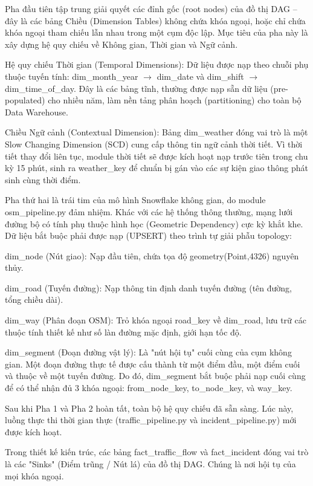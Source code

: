 Pha đầu tiên tập trung giải quyết các đỉnh gốc (root nodes) của đồ thị DAG – đây là các bảng Chiều (Dimension Tables) không chứa khóa ngoại, hoặc chỉ chứa khóa ngoại tham chiếu lẫn nhau trong một cụm độc lập. Mục tiêu của pha này là xây dựng hệ quy chiếu về Không gian, Thời gian và Ngữ cảnh.


Hệ quy chiếu Thời gian (Temporal Dimensions): Dữ liệu được nạp theo chuỗi phụ thuộc tuyến tính: dim\_month\_year $\rightarrow$  dim\_date và dim\_shift $\rightarrow$ dim\_time\_of\_day. Đây là các bảng tĩnh, thường được nạp sẵn dữ liệu (pre-populated) cho nhiều năm, làm nền tảng phân hoạch (partitioning) cho toàn bộ Data Warehouse.

Chiều Ngữ cảnh (Contextual Dimension): Bảng dim\_weather đóng vai trò là một Slow Changing Dimension (SCD) cung cấp thông tin ngữ cảnh thời tiết. Vì thời tiết thay đổi liên tục, module thời tiết sẽ được kích hoạt nạp trước tiên trong chu kỳ 15 phút, sinh ra weather\_key để chuẩn bị gán vào các sự kiện giao thông phát sinh cùng thời điểm.


Pha thứ hai là trái tim của mô hình Snowflake không gian, do module osm\_pipeline.py đảm nhiệm. Khác với các hệ thống thông thường, mạng lưới đường bộ có tính phụ thuộc hình học (Geometric Dependency) cực kỳ khắt khe. Dữ liệu bắt buộc phải được nạp (UPSERT) theo trình tự giải phẫu topology:


dim\_node (Nút giao): Nạp đầu tiên, chứa tọa độ geometry(Point,4326) nguyên thủy.


dim\_road (Tuyến đường): Nạp thông tin định danh tuyến đường (tên đường, tổng chiều dài).


dim\_way (Phân đoạn OSM): Trỏ khóa ngoại road\_key về dim\_road, lưu trữ các thuộc tính thiết kế như số làn đường mặc định, giới hạn tốc độ.


dim\_segment (Đoạn đường vật lý): Là "nút hội tụ" cuối cùng của cụm không gian. Một đoạn đường thực tế được cấu thành từ một điểm đầu, một điểm cuối và thuộc về một tuyến đường. Do đó, dim\_segment bắt buộc phải nạp cuối cùng để có thể nhận đủ 3 khóa ngoại: from\_node\_key, to\_node\_key, và way\_key.


Sau khi Pha 1 và Pha 2 hoàn tất, toàn bộ hệ quy chiếu đã sẵn sàng. Lúc này, luồng thực thi thời gian thực (traffic\_pipeline.py và incident\_pipeline.py) mới được kích hoạt.


Trong thiết kế kiến trúc, các bảng fact\_traffic\_flow và fact\_incident đóng vai trò là các "Sinks" (Điểm trũng / Nút lá) của đồ thị DAG. Chúng là nơi hội tụ của mọi khóa ngoại.


